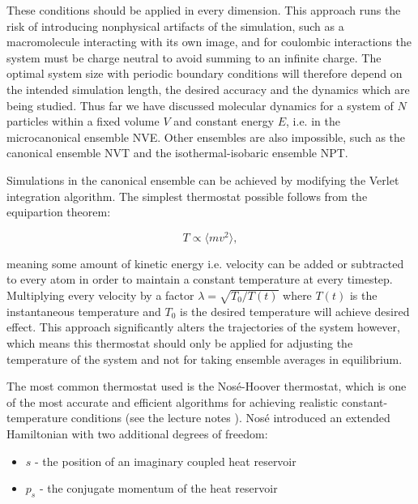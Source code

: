 These conditions should be applied in every dimension.
This approach runs the risk of introducing nonphysical artifacts
of the simulation, such as a macromolecule interacting with its own image,
and for coulombic interactions the system must be charge neutral to avoid
summing to an infinite charge.
The optimal system size with periodic boundary conditions
will therefore depend on the intended simulation length, the desired accuracy
and the dynamics which are being studied.
\newline
\newline
Thus far we have discussed molecular dynamics for a system of $N$ particles
within a fixed volume $V$ and constant energy $E$, i.e. in the
microcanonical ensemble NVE. Other ensembles are also impossible,
such as the canonical ensemble NVT and the isothermal-isobaric ensemble
NPT.
\par
Simulations in the canonical ensemble can be achieved by modifying the Verlet
integration algorithm. The simplest thermostat possible
follows from the equipartion theorem:

\begin{equation}
 T \propto \langle mv^2 \rangle , 
\end{equation}

meaning some amount of kinetic energy i.e. velocity
can be added or subtracted to every atom in order to maintain
a constant temperature at every timestep.
Multiplying every velocity by a factor $\lambda = \sqrt{T_0 / T(t)}$
where $T(t)$ is the instantaneous temperature and $T_0$
is the desired temperature will achieve desired effect.
This approach significantly alters the trajectories of the system however,
which means this thermostat should only be applied for adjusting
the temperature of the system and not for taking ensemble averages
in equilibrium.
\par
The most common thermostat used is the Nosé-Hoover thermostat,
which is one of the most accurate and efficient algorithms
for achieving realistic constant-temperature conditions
(see the lecture notes \parencite[Shell, M. Scott]{che210D2012}).
Nosé introduced an extended Hamiltonian with two additional degrees of freedom:

\begin{itemize}
    \item $s$ - the position of an imaginary coupled heat reservoir
    \item $p_s$ - the conjugate momentum of the heat reservoir
\end{itemize}

